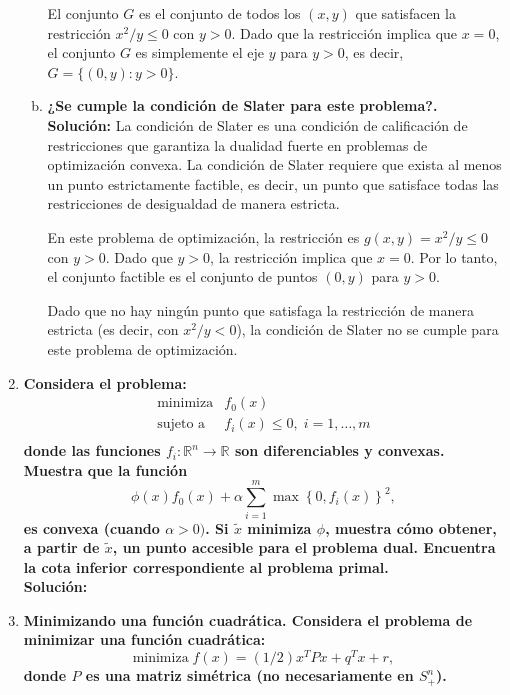 \begin{enumerate}
\begin{enumerate}[(a)]
El conjunto $G$ es el conjunto de todos los $(x,y)$ que satisfacen la restricción $x^2/y \leq 0$ con $y > 0$. Dado que la restricción implica que $x = 0$, el conjunto $G$ es simplemente el eje $y$ para $y > 0$, es decir, $G = \{(0,y) : y > 0\}$.


	\item \textbf{\boldmath ¿Se cumple la condición de Slater para este problema?.}\\

	    \textbf{Solución:} La condición de Slater es una condición de calificación de restricciones que garantiza la dualidad fuerte en problemas de optimización convexa. La condición de Slater requiere que exista al menos un punto estrictamente factible, es decir, un punto que satisface todas las restricciones de desigualdad de manera estricta.

En este problema de optimización, la restricción es $g(x,y) = x^2/y \leq 0$ con $y > 0$. Dado que $y > 0$, la restricción implica que $x = 0$. Por lo tanto, el conjunto factible es el conjunto de puntos $(0, y)$ para $y > 0$.

Dado que no hay ningún punto que satisfaga la restricción de manera estricta (es decir, con $x^2/y < 0$), la condición de Slater no se cumple para este problema de optimización.


    \end{enumerate}

    \item \textbf{\boldmath Considera el problema:
    $$
    \begin{array}{ll}
	\text{minimiza} & f_0(x)\\
	\text{sujeto a} & f_i(x)\leq 0, \; i=1,\dots,m\\
    \end{array}
    $$
    donde las funciones $f_i:\mathbb{R}^n\to \mathbb{R}$ son diferenciables y convexas. Muestra que la función
    $$\phi(x)f_0(x)+\alpha \sum_{i=1}^m \max\left\{0,f_i(x)\right\}^2,$$
    es convexa (cuando $\alpha>0)$. Si $\tilde{x}$ minimiza $\phi$, muestra cómo obtener, a partir de $\tilde{x}$, un punto accesible para el problema dual. Encuentra la cota inferior correspondiente al problema primal.}\\

	\textbf{Solución:}

    \item \textbf{\boldmath Minimizando una función cuadrática. Considera el problema de minimizar una función cuadrática:
    $$\text{minimiza} \; f(x)=(1/2)x^TPx+q^Tx+r,$$
    donde $P$ es una matriz simétrica (no necesariamente en $S^n_{+}$).}\\


\end{enumerate}
